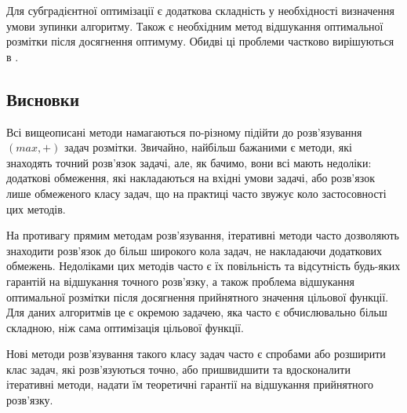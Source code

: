 Для субградієнтної оптимізації є додаткова складність у необхідності визначення
умови зупинки алгоритму. Також є необхідним метод відшукання оптимальної розмітки
після досягнення оптимуму. Обидві ці проблеми частково вирішуються в \cite{lopatka_stop_cond}.


\subsection{Висновки}

Всі вищеописані методи намагаються по-різному підійти до 
розв'язування \((max,+)\) задач розмітки. Звичайно, найбільш бажаними є методи, 
які знаходять точний розв'язок задачі, але, як бачимо, вони всі мають недоліки:
додаткові обмеження, які накладаються на вхідні умови задачі, або розв'язок 
лише обмеженого класу задач, що на практиці часто звужує коло застосовності
цих методів.

На противагу прямим методам розв'язування, ітеративні методи часто дозволяють
знаходити розв'язок до більш широкого кола задач, не накладаючи додаткових
обмежень. Недоліками цих методів часто є їх повільність та відсутність 
будь-яких гарантій на відшукання точного розв'язку, а також проблема відшукання
оптимальної розмітки після досягнення прийнятного значення цільової функції.
Для даних алгоритмів це є окремою задачею, яка часто є обчислювально більш 
складною, ніж сама оптимізація цільової функції.

Нові методи розв'язування такого класу задач часто є спробами або розширити 
клас задач, які розв'язуються точно, або пришвидшити та вдосконалити
ітеративні методи, надати їм теоретичні гарантії на відшукання 
прийнятного розв'язку.